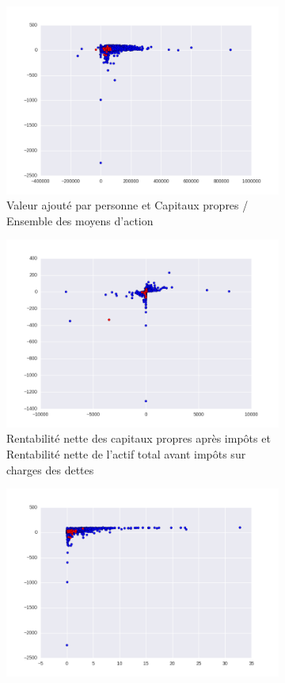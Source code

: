 \documentclass[DIV=calc, paper=a4, fontsize=11pt, twocolumn]{scrartcl}
\begin{document}
\begin{appendices}
\begin{figure}
\begin{subfigure}{.45\textwidth}
    \includegraphics[width=\linewidth]{cr4xr19.png}
    \caption{ Valeur ajouté par personne et Capitaux propres / Ensemble des moyens d’action}
  \end{subfigure}
  \begin{subfigure}{.45\textwidth}
    \centering
    \includegraphics[width=\linewidth]{cr9xr12.png}
    \caption{Rentabilité nette des capitaux propres après impôts et Rentabilité nette de l’actif total avant impôts sur charges des dettes}
  \end{subfigure}
  \begin{subfigure}{.40\textwidth}
    \centering
    \includegraphics[width=\linewidth]{cr14xr19.png}

\end{subfigure}
\end{figure}
\end{appendices}
\end{document}

